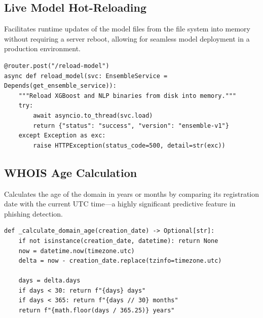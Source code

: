 \subsection{Live Model Hot-Reloading}
\noindent
Facilitates runtime updates of the model files from the file system into memory without requiring a server reboot, allowing for seamless model deployment in a production environment.

\begin{listing}[htbp]
\begin{verbatim}
@router.post("/reload-model")
async def reload_model(svc: EnsembleService = Depends(get_ensemble_service)):
    """Reload XGBoost and NLP binaries from disk into memory."""
    try:
        await asyncio.to_thread(svc.load)
        return {"status": "success", "version": "ensemble-v1"}
    except Exception as exc:
        raise HTTPException(status_code=500, detail=str(exc))
\end{verbatim}
\caption{Runtime Model Hot-Reloading Logic (predict.py)}
\label{lst:hot_reload}
\end{listing}


\subsection{WHOIS Age Calculation}
\noindent
Calculates the age of the domain in years or months by comparing its registration date with the current UTC time—a highly significant predictive feature in phishing detection.

\begin{listing}[htbp]
\begin{verbatim}
def _calculate_domain_age(creation_date) -> Optional[str]:
    if not isinstance(creation_date, datetime): return None
    now = datetime.now(timezone.utc)
    delta = now - creation_date.replace(tzinfo=timezone.utc)
    
    days = delta.days
    if days < 30: return f"{days} days"
    if days < 365: return f"{days // 30} months"
    return f"{math.floor(days / 365.25)} years"
\end{verbatim}
\caption{Domain Age Calculation from WHOIS Registry (whois\_service.py)}
\label{lst:whois_age}
\end{listing}
